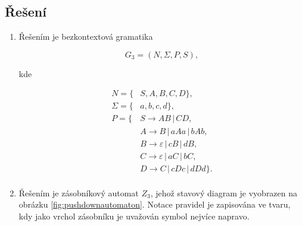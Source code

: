 \documentclass[a4paper, 12pt]{article}
\theoremstyle{definition}
\theoremstyle{definition}
\theoremstyle{definition}
\theoremstyle{remark}
\begin{document}
\subsection{Řešení}

\begin{enumerate}[label=(\alph*)]
    \item Řešením je bezkontextová gramatika

    $$G_3 = (N, \Sigma, P, S),$$

    kde

    \begin{align*}
        N = \{&S, A, B, C, D\}, \\
        \Sigma = \{&a, b, c, d\}, \\
        P = \{&S \rightarrow AB \, | \, CD, \\
              &A \rightarrow B \, | \, aAa \, | \, bAb, \\
              &B \rightarrow \varepsilon \, | \, cB \, | \, dB, \\
              &C \rightarrow \varepsilon \, | \, aC \, | \, bC, \\
              &D \rightarrow C \, | \, cDc \, | \, dDd\}. \\            
    \end{align*}

    \item Řešením je zásobníkový automat $Z_3$, jehož stavový diagram je vyobrazen na obrázku \ref{fig:pushdownautomaton}. Notace pravidel je zapisována ve tvaru, kdy jako vrchol zásobníku je uvažován symbol nejvíce napravo.

    \begin{landscape}    
        \hfill
        \begin{figure}[ht!]
        \begin{center}
            \hspace*{0.15\linewidth}    
            
\end{center}
\end{figure}
\end{landscape}
\end{enumerate}
\end{document}
